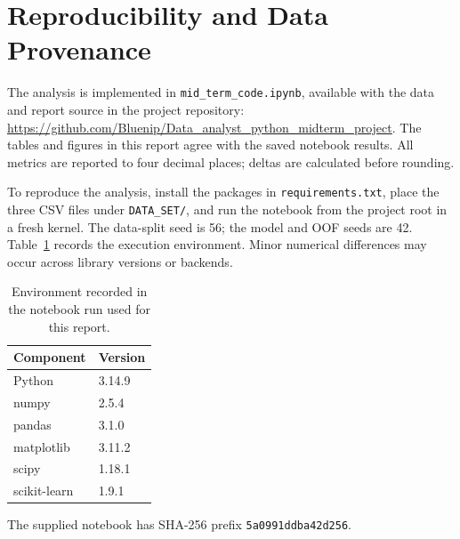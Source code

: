 \documentclass[12pt,a4paper]{article}
\begin{document}
\FloatBarrier
\Needspace{0.45\textheight}
\section*{Reproducibility and Data Provenance}
The analysis is implemented in \nolinkurl{mid_term_code.ipynb}, available with the data and
report source in the project repository:
\url{https://github.com/Bluenip/Data_analyst_python_midterm_project}.
The tables and figures in this report agree with the saved notebook results. All metrics are
reported to four decimal places; deltas are calculated before rounding.

To reproduce the analysis, install the packages in \nolinkurl{requirements.txt}, place the three
CSV files under \nolinkurl{DATA_SET/}, and run the notebook from the project root in a fresh kernel.
The data-split seed is 56; the model and OOF seeds are 42. Table~\ref{tab:environment} records the
execution environment. Minor numerical differences may occur across library versions or backends.

\begin{table}[htbp]
\centering
\caption{Environment recorded in the notebook run used for this report.}\label{tab:environment}
\begin{tabular}{ll}
\toprule
Component & Version \\
\midrule
Python & 3.14.9 \\
numpy & 2.5.4 \\
pandas & 3.1.0 \\
matplotlib & 3.11.2 \\
scipy & 1.18.1 \\
scikit-learn & 1.9.1 \\
\bottomrule
\end{tabular}
\end{table}

The supplied notebook has SHA-256 prefix \nolinkurl{5a0991ddba42d256}.
\end{document}
